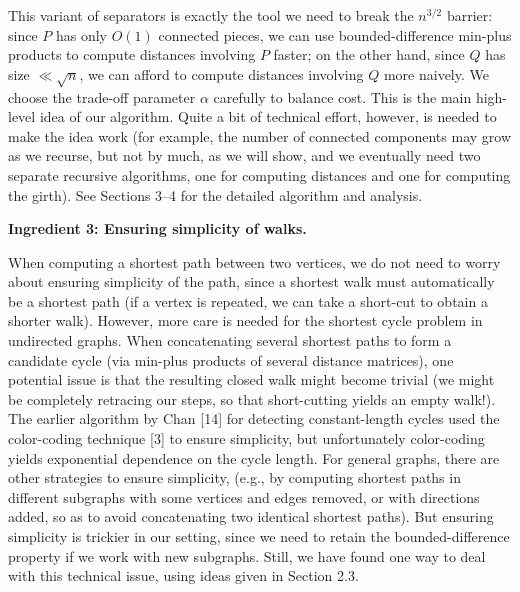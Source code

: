 \documentclass[10pt,a4paper]{article}
\begin{document}
\par
\par
This variant of separators is exactly the tool we need to break the $n^{3/2}$ barrier: since $P$ has only $O(1)$ connected pieces, we can use bounded-difference min-plus products to compute distances involving $P$ faster; on the other hand, since $Q$ has size $\ll\sqrt{n}$, we can afford to compute distances involving $Q$ more naively. We choose the trade-off parameter $\alpha$ carefully to balance cost. This is the main high-level idea of our algorithm. Quite a bit of technical effort, however, is needed to make the idea work (for example, the number of connected components may grow as we recurse, but not by much, as we will show, and we eventually need two separate recursive algorithms, one for computing distances and one for computing the girth). See Sections 3–4 for the detailed algorithm and analysis.
\par
\par
\par\medskip\noindent\textbf{Ingredient 3: Ensuring simplicity of walks.}\par
When computing a shortest path between two vertices, we do not need to worry about ensuring simplicity of the path, since a shortest walk must automatically be a shortest path (if a vertex is repeated, we can take a short-cut to obtain a shorter walk). However, more care is needed for the shortest cycle problem in undirected graphs. When concatenating several shortest paths to form a candidate cycle (via min-plus products of several distance matrices), one potential issue is that the resulting closed walk might become trivial (we might be completely retracing our steps, so that short-cutting yields an empty walk!). The earlier algorithm by Chan [14] for detecting constant-length cycles used the color-coding technique [3] to ensure simplicity, but unfortunately color-coding yields exponential dependence on the cycle length. For general graphs, there are other strategies to ensure simplicity, (e.g., by computing shortest paths in different subgraphs with some vertices and edges removed, or with directions added, so as to avoid concatenating two identical shortest paths). But ensuring simplicity is trickier in our setting, since we need to retain the bounded-difference property if we work with new subgraphs. Still, we have found one way to deal with this technical issue, using ideas given in Section 2.3.
\end{document}
